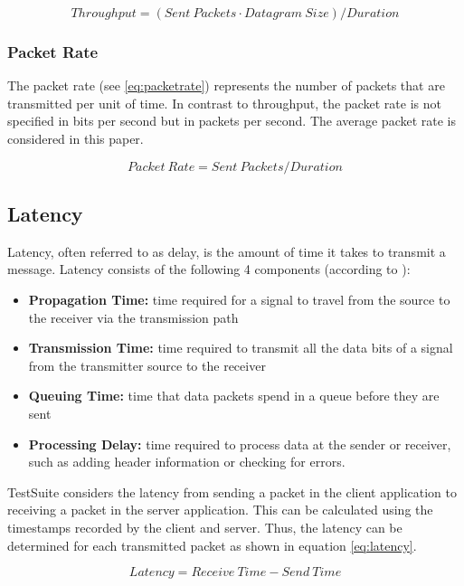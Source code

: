 \begin{equation}
Throughput = (Sent\ Packets \cdot Datagram\ Size) / Duration
\label{eq:throughput}
\end{equation}

\subsubsection{Packet Rate}
The packet rate (see \ref{eq:packetrate}) represents the number of packets that are transmitted per unit of time. In contrast to throughput, the packet rate is not specified in bits per second but in packets per second. The average packet rate is considered in this paper.


\begin{equation}
Packet\ Rate = Sent\ Packets / Duration
\label{eq:packetrate}
\end{equation}

\subsection{Latency} \label{chap:LatencyExplanation}
Latency, often referred to as delay, is the amount of time it takes to transmit a message. Latency consists of the following 4 components (according to \cite{datacalc02}):

\begin{itemize}
	\item \textbf{Propagation Time:} time required for a signal to travel from the source to the receiver via the transmission path
	\item \textbf{Transmission Time:} time required to transmit all the data bits of a signal from the transmitter source to the receiver
	\item \textbf{Queuing Time:} time that data packets spend in a queue before they are sent
	\item \textbf{Processing Delay:} time required to process data at the sender or receiver, such as adding header information or checking for errors.
\end{itemize}

TestSuite considers the latency from sending a packet in the client application to receiving a packet in the server application. This can be calculated using the timestamps recorded by the client and server. Thus, the latency can be determined for each transmitted packet as shown in equation \ref{eq:latency}.

\begin{equation}
Latency = Receive\ Time - Send\ Time
\label{eq:latency}
\end{equation}

